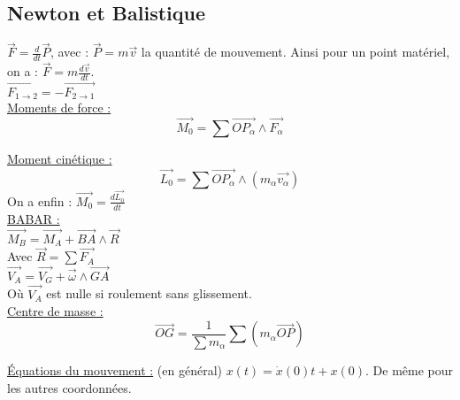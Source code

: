 \documentclass[../main.tex]{subfiles}
\begin{document}
\localtableofcontents
\subsection{Newton et Balistique}
$\vec{F} = \frac{d}{dt} \vec{P}$, avec : $\vec{P} = m\vec{v}$ la quantité de mouvement. Ainsi pour un point matériel, on a : $\vec{F} = m \frac{d \vec{v}}{dt}$.\\
$\vec{F_{1\rightarrow 2}} = -\vec{F_{2\rightarrow 1}}$\\

\quad \underline{Moments de force :}\\
\begin{equation}
    \vec{M_0} = \sum \vec{OP_{\alpha}} \wedge \vec{F_{\alpha}}
\end{equation}

\quad \underline{Moment cinétique :} \\
\begin{equation}
    \vec{L_0} = \sum \vec{OP_{\alpha}} \wedge (m_{\alpha} \vec{v_{\alpha}})
\end{equation}
On a enfin : $\vec{M_0} = \frac{d \vec{L_0}}{dt}$\\

\quad \underline{BABAR :}\\
$\vec{M_B} = \vec{M_A} + \vec{BA} \wedge \vec{R}$\\
Avec $\vec{R} = \sum \vec{F_A}$\\
$\vec{V_A} = \vec{V_G} + \vec{\omega} \wedge \vec{GA}$\\
Où $\vec{V_A}$ est nulle si roulement sans glissement.\\

\quad \underline{Centre de masse :}\\
\begin{equation}
    \vec{OG} = \frac{1}{\sum m_{\alpha}} \sum (m_{\alpha} \vec{OP})
\end{equation}

\underline{Équations du mouvement :} (en général) $x(t) = \dot{x}(0)t + x(0) $. De même pour les autres coordonnées.\\
\end{document}
